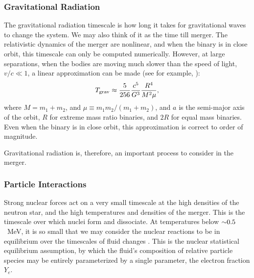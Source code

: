 \subsubsection{Gravitational Radiation}
The gravitational radiation timescale is how long it takes for gravitational
waves to change the system. We may also think of it as the time till merger.
The relativistic dynamics of the merger
are nonlinear, and when the binary is in close orbit, this timescale can only
be computed numerically. However, at large separations, when the bodies are
moving much slower than the speed of light, $v/c\ll1$, a linear approximation
can be made (see for example, \citealt[Sec.~16.4]{shap1983-bh_wd_ns}):
\begin{equation}
  T_{\rm grav} \approx \frac{5}{256}\frac{c^5}{G^3}\frac{R^4}{M^2\mu},
\end{equation}
where $M=m_1+m_2$, and $\mu \equiv m_1 m_2/(m_1+m_2)$, and $a$ is the semi-major
axis of the orbit, $R$ for extreme mass ratio binaries, and $2R$ for equal mass
binaries.
Even when the binary is in close orbit, this approximation is correct to order
of magnitude.

Gravitational radiation is, therefore, an important process to consider in the
merger.

\subsubsection{Particle Interactions}
Strong nuclear forces act on a very small timescale at the high
densities of the neutron star, and the high temperatures and densities of the
merger. This is the timescale over which
nuclei form and dissociate. At temperatures below $\mathord{\sim}0.5$~MeV, it is so small
that we may consider the nuclear reactions to be in equilibrium over the
timescales of fluid changes \citep{stei2013-eos_from_ns_obs}.
This is the nuclear statistical equilibrium assumption, by which the fluid's
composition of relative particle species may be entirely parameterized by a
single parameter, the electron fraction $Y_e$.

